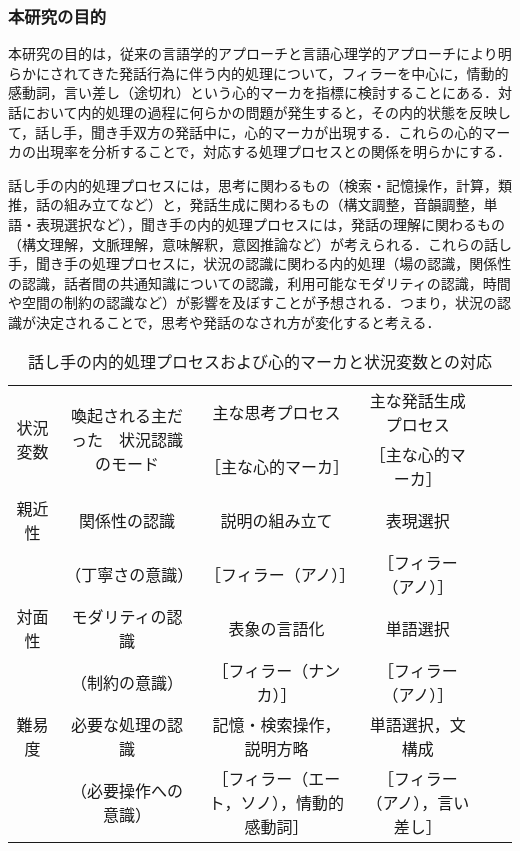 \documentclass[japanese]{jnlp_1.3a}
\begin{document}
\subsubsection{本研究の目的}

本研究の目的は，従来の言語学的アプローチと言語心理学的アプローチにより明らかにされてきた発話行為に伴う内的処理について，フィラーを中心に，情動的感動詞，言い差し（途切れ）という心的マーカを指標に検討することにある．対話において内的処理の過程に何らかの問題が発生すると，その内的状態を反映して，話し手，聞き手双方の発話中に，心的マーカが出現する．これらの心的マーカの出現率を分析することで，対応する処理プロセスとの関係を明らかにする．

話し手の内的処理プロセスには，思考に関わるもの（検索・記憶操作，計算，類推，話の組み立てなど）と，発話生成に関わるもの（構文調整，音韻調整，単語・表現選択など），聞き手の内的処理プロセスには，発話の理解に関わるもの（構文理解，文脈理解，意味解釈，意図推論など）が考えられる．これらの話し手，聞き手の処理プロセスに，状況の認識に関わる内的処理（場の認識，関係性の認識，話者間の共通知識についての認識，利用可能なモダリティの認識，時間や空間の制約の認識など）が影響を及ぼすことが予想される．つまり，状況の認識が決定されることで，思考や発話のなされ方が変化すると考える．


\begin{table}[b]
\begin{center}
\caption{話し手の内的処理プロセスおよび心的マーカと状況変数との対応}
\label{map_speaker}
\scriptsize
\begin{tabular}{c c c c c c} \hline 
\multirow{2}{12mm}{状況変数} & \multirow{2}{24mm}{喚起される主だった　状況認識のモード} & 主な思考プロセス & 主な発話生成プロセス\\
 & & ［主な心的マーカ］& ［主な心的マーカ］\\ \hline
親近性 & 関係性の認識 & 説明の組み立て & 表現選択\\
 & （丁寧さの意識） & ［フィラー（アノ）］ & ［フィラー（アノ）］ &\\
対面性 & モダリティの認識 & 表象の言語化 & 単語選択\\
 & （制約の意識） & ［フィラー（ナンカ）］ & ［フィラー（アノ）］\\
難易度 & 必要な処理の認識 & 記憶・検索操作，説明方略 & 単語選択，文構成\\
 & （必要操作への意識） & ［フィラー（エート，ソノ），情動的感動詞］ & ［フィラー（アノ），言い差し］\\ \hline
\end{tabular}
\end{center}
\end{table}
\end{document}
